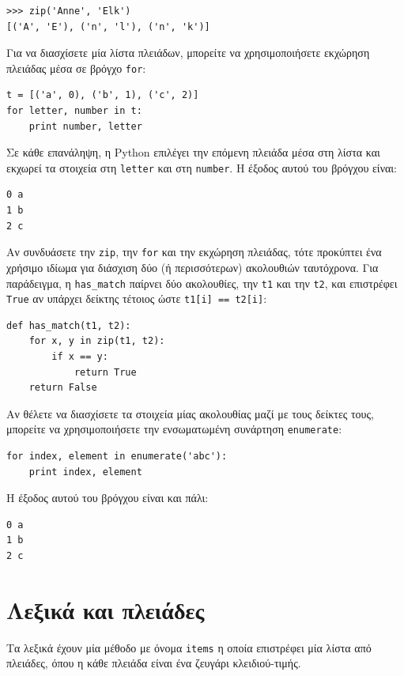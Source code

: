 \documentclass[10pt]{book}
\begin{document}
\begin{verbatim}
>>> zip('Anne', 'Elk')
[('A', 'E'), ('n', 'l'), ('n', 'k')]
\end{verbatim}
%
Για να διασχίσετε μία λίστα πλειάδων, μπορείτε να χρησιμοποιήσετε εκχώρηση πλειάδας μέσα σε βρόγχο {\tt for}:

\begin{verbatim}
t = [('a', 0), ('b', 1), ('c', 2)]
for letter, number in t:
    print number, letter
\end{verbatim}
%
Σε κάθε επανάληψη, η Python επιλέγει την επόμενη πλειάδα μέσα στη λίστα και εκχωρεί τα στοιχεία στη {\tt letter} και στη {\tt number}. Η έξοδος αυτού του βρόγχου είναι:

\begin{verbatim}
0 a
1 b
2 c
\end{verbatim}
%
Αν συνδυάσετε την {\tt zip}, την {\tt for} και την εκχώρηση πλειάδας, τότε προκύπτει ένα χρήσιμο ιδίωμα για διάσχιση δύο (ή περισσότερων) ακολουθιών ταυτόχρονα. Για παράδειγμα, η \verb"has_match" παίρνει δύο ακολουθίες, την  {\tt t1} και την {\tt t2}, και επιστρέφει {\tt True} αν υπάρχει δείκτης τέτοιος ώστε {\tt t1[i] == t2[i]}:

\begin{verbatim}
def has_match(t1, t2):
    for x, y in zip(t1, t2):
        if x == y:
            return True
    return False
\end{verbatim}
%
Αν θέλετε να διασχίσετε τα στοιχεία μίας ακολουθίας μαζί με τους δείκτες τους, μπορείτε να χρησιμοποιήσετε την ενσωματωμένη συνάρτηση {\tt enumerate}:

\begin{verbatim}
for index, element in enumerate('abc'):
    print index, element
\end{verbatim}
%
Η έξοδος αυτού του βρόγχου είναι και πάλι:

\begin{verbatim}
0 a
1 b
2 c
\end{verbatim}
%


\section{Λεξικά και πλειάδες}
\label{dictuple}

Τα λεξικά έχουν μία μέθοδο με όνομα {\tt items} η οποία επιστρέφει μία λίστα από πλειάδες, όπου η κάθε πλειάδα είναι ένα ζευγάρι κλειδιού-τιμής.
\end{document}
